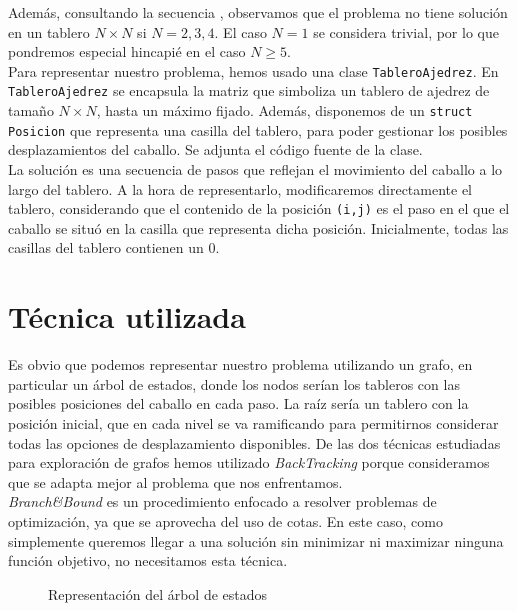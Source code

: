 \documentclass[11pt]{article}
\begin{document}
Además, consultando la secuencia \cite{sequence}, observamos que el problema no tiene solución en un tablero $N\times N$ si $N=2,3,4$. El caso $N=1$ se considera trivial, por lo que pondremos especial hincapié en el caso $N\ge5$.\\

Para representar nuestro problema, hemos usado una clase \verb|TableroAjedrez|. En \verb|TableroAjedrez| se encapsula la matriz que simboliza un tablero de ajedrez de tamaño $N\times N$, hasta un máximo fijado. Además, disponemos de un \verb|struct Posicion| que representa una casilla del tablero, para poder gestionar los posibles desplazamientos del caballo. Se adjunta el código fuente de la clase.\\

La solución es una secuencia de pasos que reflejan el movimiento del caballo a lo largo del tablero. A la hora de representarlo, modificaremos directamente el tablero, considerando que el contenido de la posición \verb|(i,j)| es el paso en el que el caballo se situó en la casilla que representa dicha posición. Inicialmente, todas las casillas del tablero contienen un $0$.

\section*{Técnica utilizada}

Es obvio que podemos representar nuestro problema utilizando un grafo, en particular un árbol de estados, donde los nodos serían los tableros con las posibles posiciones del caballo en cada paso. La raíz sería un tablero con la posición inicial, que en cada nivel se va ramificando para permitirnos considerar todas las opciones de desplazamiento disponibles. De las dos técnicas estudiadas para exploración de grafos hemos utilizado \textit{BackTracking} porque consideramos que se adapta mejor al problema que nos enfrentamos.\\

\textit{Branch\&Bound} es un procedimiento enfocado a resolver problemas de optimización, ya que se aprovecha del uso de cotas. En este caso, como simplemente queremos llegar a una solución sin minimizar ni maximizar ninguna función objetivo, no necesitamos esta técnica.


\begin{figure}[h]
\caption{Representación del árbol de estados} \label{fig:árbol}
\end{figure}
\end{document}
